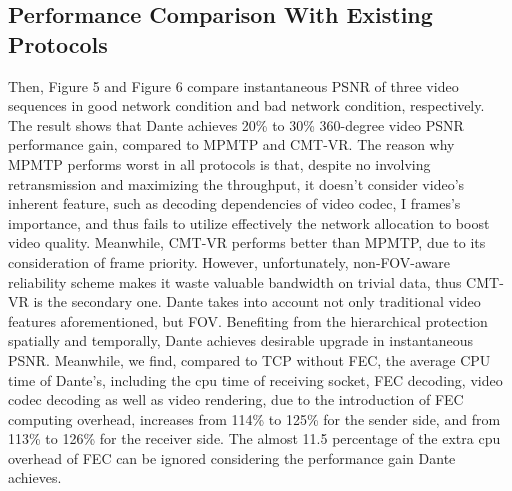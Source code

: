 

\subsection{Performance Comparison With Existing Protocols}

Then, Figure 5 and Figure 6 compare instantaneous PSNR of three video sequences in good network condition and bad network condition, respectively. The result shows that Dante achieves 20\% to 30\% 360-degree video PSNR performance gain, compared to MPMTP and CMT-VR. The reason why MPMTP performs worst in all protocols is that, despite no involving retransmission and maximizing the throughput, it doesn't consider video's inherent feature, such as decoding dependencies of video codec, \ie I frames's importance, and thus fails to utilize effectively the network allocation to boost video quality. Meanwhile, CMT-VR performs better than MPMTP, due to its consideration of frame priority. However, unfortunately, non-FOV-aware reliability scheme makes it waste valuable bandwidth on trivial data, thus CMT-VR is the secondary one. Dante takes into account not only traditional video features aforementioned, but FOV. Benefiting from the hierarchical protection spatially and temporally, Dante achieves desirable upgrade in instantaneous PSNR. Meanwhile, we find, compared to TCP without FEC, the average CPU time of Dante's, including the cpu time of receiving socket, FEC decoding, video codec decoding as well as video rendering, due to the introduction of FEC computing overhead, increases from 114\% to 125\% for the sender side, and from 113\% to 126\% for the receiver side. The almost 11.5 percentage of the extra cpu overhead of FEC can be ignored considering the performance gain Dante achieves.    

